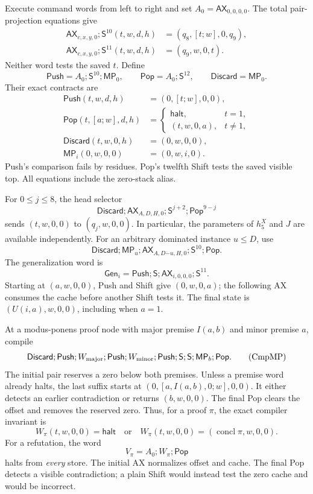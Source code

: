 Execute command words from left to right and set $A_0=\mathsf{AX}_{0,0,0,0}$.
The total pair-projection equations give
\begin{align*}
 \mathsf{AX}_{c,x,y,0};\mathsf S^{10}(t,w,d,h)&=(q_8,[t;w],0,q_9),\\
 \mathsf{AX}_{c,x,y,0};\mathsf S^{11}(t,w,d,h)&=(q_9,w,0,t).
\end{align*}
Neither word tests the saved $t$.  Define
\[
 \mathsf{Push}=A_0;\mathsf S^{10};\mathsf{MP}_0,\qquad
 \mathsf{Pop}=A_0;\mathsf S^{12},\qquad
 \mathsf{Discard}=\mathsf{MP}_0.
\]
Their exact contracts are
\begin{align*}
 \mathsf{Push}(t,w,d,h)&=(0,[t;w],0,0),\\
 \mathsf{Pop}(t,[a;w],d,h)&=
   \begin{cases}\mathsf{halt},&t=1,\\(t,w,0,a),&t\ne1,\end{cases}\\
 \mathsf{Discard}(t,w,0,h)&=(0,w,0,0),\\
 \mathsf{MP}_i(0,w,0,0)&=(0,w,i,0).
\end{align*}
Push's comparison fails by residues.  Pop's twelfth Shift tests the saved
visible top.  All equations include the zero-stack alias.

For $0\le j\le8$, the head selector
\[
 \mathsf{Discard};\mathsf{AX}_{A,D,H,0};
              \mathsf S^{j+2};\mathsf{Pop}^{9-j}           \tag{Sel}
\]
sends $(t,w,0,0)$ to $(q_j,w,0,0)$.  In particular, the parameters of
$h_5^X$ and $J$ are available independently.  For an arbitrary dominated
instance $u\le D$, use
\[
 \mathsf{Discard};\mathsf{MP}_u;
 \mathsf{AX}_{A,D\mathbin{\dot-}u,H,0};
              \mathsf S^{10};\mathsf{Pop}.                \tag{Rho}
\]
The generalization word is
\[
 \mathsf{Gen}_i=\mathsf{Push};\mathsf S;
                   \mathsf{AX}_{i,0,0,0};\mathsf S^{11}.  \tag{Gen}
\]
Starting at $(a,w,0,0)$, Push and Shift give $(0,w,0,a)$; the following
AX consumes the cache before another Shift tests it.  The final state is
$(U(i,a),w,0,0)$, including when $a=1$.

At a modus-ponens proof node with major premise $I(a,b)$ and minor premise
$a$, compile
\[
 \mathsf{Discard};\mathsf{Push};W_{\rm major};
 \mathsf{Push};W_{\rm minor};\mathsf{Push};
 \mathsf S;\mathsf S;\mathsf{MP}_b;\mathsf{Pop}.          \tag{CmpMP}
\]
The initial pair reserves a zero below both premises.  Unless a premise
word already halts, the last suffix starts at
$(0,[a,I(a,b),0;w],0,0)$.  It either detects an earlier contradiction or
returns $(b,w,0,0)$.  The final Pop clears the offset and removes the
reserved zero.  Thus, for a proof $\pi$, the exact compiler invariant is
\[
 W_\pi(t,w,0,0)=\mathsf{halt}\quad\text{or}\quad
 W_\pi(t,w,0,0)=(\operatorname{concl}\pi,w,0,0).          \tag{Cmp}
\]
For a refutation, the word
\[
             V_\pi=A_0;W_\pi;\mathsf{Pop}               \tag{Ref}
\]
halts from \emph{every} store.  The initial AX normalizes offset and
cache.  The final Pop detects a visible contradiction; a plain Shift
would instead test the zero cache and would be incorrect.

